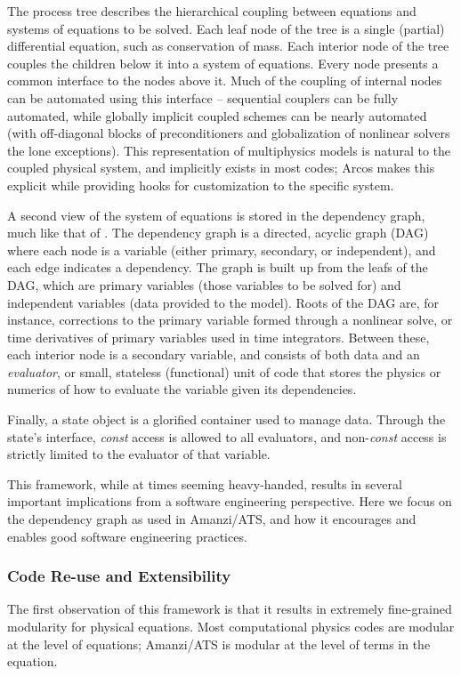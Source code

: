 The process tree describes the hierarchical coupling between equations and systems of equations to be solved.
Each leaf node of the tree is a single (partial) differential equation, such as conservation of mass.
Each interior node of the tree couples the children below it into a system of equations.
Every node presents a common interface to the nodes above it.
Much of the coupling of internal nodes can be automated using this interface -- sequential couplers can be fully automated, while globally implicit coupled schemes can be nearly automated (with off-diagonal blocks of preconditioners and globalization of nonlinear solvers the lone exceptions).
This representation of multiphysics models is natural to the coupled physical system, and implicitly exists in most codes; Arcos makes this explicit while providing hooks for customization to the specific system.

A second view of the system of equations is stored in the dependency graph, much like that of \cite{Notz2012}.
The dependency graph is a directed, acyclic graph (DAG) where each node is a variable (either primary, secondary, or independent), and each edge indicates a dependency.
The graph is built up from the leafs of the DAG, which are primary variables (those variables to be solved for) and independent variables (data provided to the model).  Roots of the DAG are, for instance, corrections to the primary variable formed through a nonlinear solve, or time derivatives of primary variables used in time integrators.
Between these, each interior node is a secondary variable, and consists of both data and an \emph{evaluator}, or small, stateless (functional) unit of code that stores the physics or numerics of how to evaluate the variable given its dependencies.

Finally, a state object is a glorified container used to manage data.
Through the state's interface, \emph{const} access is allowed to all evaluators, and non-\emph{const} access is strictly limited to the evaluator of that variable.

This framework, while at times seeming heavy-handed, results in several important implications from a software engineering perspective.
Here we focus on the dependency graph as used in Amanzi/ATS, and how it encourages and enables good software engineering practices.

\subsubsection{Code Re-use and Extensibility}
\label{sec:amanzi:modularity}
%
The first observation of this framework is that it results in extremely fine-grained modularity for physical equations.
Most computational physics codes are modular at the level of equations; Amanzi/ATS is modular at the level of terms in the equation.


